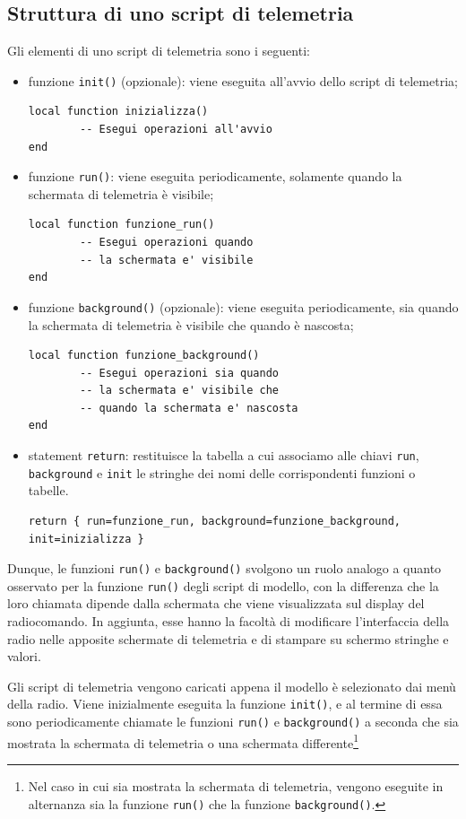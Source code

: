 \documentclass[a4paper, 12pt]{report}
\begin{document}
\subsection{Struttura di uno script di telemetria}
Gli elementi di uno script di telemetria sono i seguenti:
\begin{itemize}
        \item funzione \texttt{init()} (opzionale): viene eseguita all'avvio dello script di telemetria;
\begin{lstlisting}
local function inizializza()
        -- Esegui operazioni all'avvio
end
\end{lstlisting}
        \item funzione \texttt{run()}: viene eseguita periodicamente, solamente quando la schermata di telemetria è visibile;
\begin{lstlisting}
local function funzione_run()
        -- Esegui operazioni quando
        -- la schermata e' visibile
end
\end{lstlisting}
        \item funzione \texttt{background()} (opzionale): viene eseguita periodicamente, sia quando la schermata di telemetria è visibile che quando è nascosta;
\begin{lstlisting}
local function funzione_background()
        -- Esegui operazioni sia quando
        -- la schermata e' visibile che
        -- quando la schermata e' nascosta
end
\end{lstlisting}

        \item statement \texttt{return}: restituisce la tabella a cui associamo alle chiavi \texttt{run}, \texttt{background} e \texttt{init} le stringhe dei nomi delle corrispondenti funzioni o tabelle.
\begin{lstlisting}
return { run=funzione_run, background=funzione_background, init=inizializza }
\end{lstlisting}
\end{itemize}

Dunque, le funzioni \texttt{run()} e \texttt{background()} svolgono un ruolo analogo a quanto osservato per la funzione \texttt{run()} degli script di modello, con la differenza che la loro chiamata dipende dalla schermata che viene visualizzata sul display del radiocomando. In aggiunta, esse hanno la facoltà di modificare l'interfaccia della radio nelle apposite schermate di telemetria e di stampare su schermo stringhe e valori.

Gli script di telemetria vengono caricati appena il modello è selezionato dai menù della radio. Viene inizialmente eseguita la funzione \texttt{init()}, e al termine di essa sono periodicamente chiamate le funzioni \texttt{run()} e \texttt{background()} a seconda che sia mostrata la schermata di telemetria o una schermata differente\footnote{\scriptsize Nel caso in cui sia mostrata la schermata di telemetria, vengono eseguite in alternanza sia la funzione \texttt{run()} che la funzione \texttt{background()}.}
\end{document}
